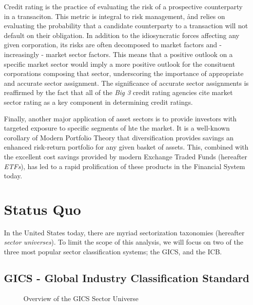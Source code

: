 \documentclass[../main.tex]{subfiles}
\begin{document}
Credit rating is the practice of evaluating the risk of a prospective counterparty in a transaciton. This metric is integral to risk management, ånd relies on evaluating the probability that a candidate counterparty to a transaction will not default on their obligation. In addition to the idiosyncratic forces affecting any given corporation, its risks are often decomposed to market factors and - increasingly - market sector factors. This means that a positive outlook on a specific market sector would imply a more positive outlook for the consituent corporations composing that sector, underscoring the importance of appropriate and accurate sector assignment. The significance of accurate sector assignments is reaffirmed by the fact that all of the \textit{Big 3} credit rating agencies cite market sector rating as a key component in determining credit ratings.

Finally, another major application of asset sectors is to provide investors with targeted exposure to specific segments of hte the market. It is a well-known corollary of Modern Portfolio Theory that diversification provides savings an enhanced risk-return portfolio for any given basket of assets. This, combined with the excellent cost savings provided by modern Exchange Traded Funds (hereafter \textit{ETFs}), has led to a rapid prolification of these products in the Financial System today.

\section{Status Quo}

In the United States today, there are myriad sectorization taxonomies (hereafter \textit{sector universes}). To limit the scope of this analysis, we will focus on two of the three most popular sector classification systems; the GICS, and the ICB.

\subsection{GICS - Global Industry Classification Standard}

\begin{figure}
    \centering
    \vspace{\wrapfigadjustment}
    \caption{Overview of the GICS Sector Universe}
    \label{fig:introduction:gics_breakdown}
\end{figure}
\end{document}

